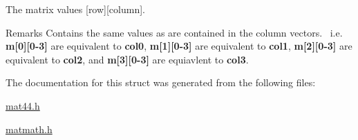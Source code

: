The matrix values \mbox{[}row\mbox{]}\mbox{[}column\mbox{]}. 

\begin{DoxyRemark}{Remarks}
Contains the same values as are contained in the column vectors.~\newline
 i.\+e. {\bfseries m\mbox{[}0\mbox{]}\mbox{[}0-\/3\mbox{]}} are equivalent to {\bfseries col0}, {\bfseries m\mbox{[}1\mbox{]}\mbox{[}0-\/3\mbox{]}} are equivalent to {\bfseries col1}, {\bfseries m\mbox{[}2\mbox{]}\mbox{[}0-\/3\mbox{]}} are equivalent to {\bfseries col2}, and {\bfseries m\mbox{[}3\mbox{]}\mbox{[}0-\/3\mbox{]}} are equiavlent to {\bfseries col3}. 
\end{DoxyRemark}


The documentation for this struct was generated from the following files\+:\begin{DoxyCompactItemize}
\item 
\hyperlink{mat44_8h}{mat44.\+h}\item 
\hyperlink{matmath_8h}{matmath.\+h}\end{DoxyCompactItemize}
